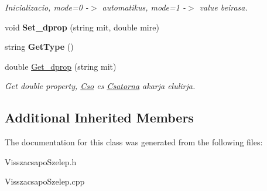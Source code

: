 \begin{DoxyCompactItemize}
\begin{DoxyCompactList}\small\item\em Inicializacio, mode=0 -\/$>$ automatikus, mode=1 -\/$>$ value beirasa. \end{DoxyCompactList}\item 
\mbox{\label{class_visszacsapo_szelep_a926e1eca26c657b4a7c2a6ac90c78729}} 
void {\bfseries Set\+\_\+dprop} (string mit, double mire)
\item 
\mbox{\label{class_visszacsapo_szelep_aa30043b601103db38fec768e510c3ebe}} 
string {\bfseries Get\+Type} ()
\item 
\mbox{\label{class_visszacsapo_szelep_a01274e2b4d1455da68e1df65ac9823eb}} 
double \hyperlink{class_visszacsapo_szelep_a01274e2b4d1455da68e1df65ac9823eb}{Get\+\_\+dprop} (string mit)
\begin{DoxyCompactList}\small\item\em Get double property, \hyperlink{class_cso}{Cso} es \hyperlink{class_csatorna}{Csatorna} akarja elulirja. \end{DoxyCompactList}\end{DoxyCompactItemize}
\subsection*{Additional Inherited Members}


The documentation for this class was generated from the following files\+:\begin{DoxyCompactItemize}
\item 
Visszacsapo\+Szelep.\+h\item 
Visszacsapo\+Szelep.\+cpp\end{DoxyCompactItemize}
